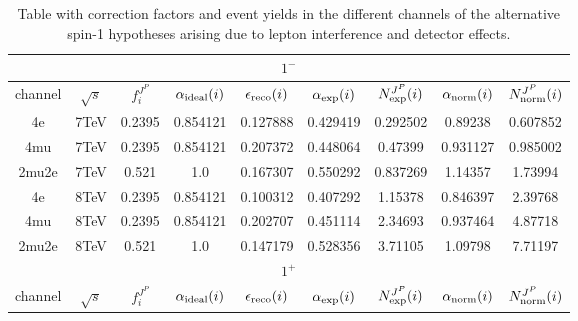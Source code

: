 
\begin{table}[b]
\centering
\caption{
Table with correction factors and event yields in the different
channels of the alternative spin-1 hypotheses arising
due to lepton interference and detector effects.}
\centering %
\begin{tabular}{c c c c c c c c c} %
\hline \hline
 \multicolumn{9}{|c|}{$1^{-}$} \\ \hline 
channel & $\sqrt{s}$ & $f_{i}^{J^P}$ & $\alpha_{\rm ideal} (i)$ & $\epsilon_{\rm reco} (i)$ & $\alpha_{\rm exp} (i)$ & $N^{J^P}_{\rm exp} (i)$ & $\alpha_{\rm norm} (i)$ & $N^{J^P}_{\rm norm} (i)$\\ \hline 
4e & 7TeV & 0.2395 & 0.854121 & 0.127888 & 0.429419
 & 0.292502%
 & 0.89238 & 0.607852 \\ \hline 4mu & 7TeV & 0.2395 & 0.854121 & 0.207372 & 0.448064
 & 0.47399%
 & 0.931127 & 0.985002 \\ \hline 2mu2e & 7TeV & 0.521 & 1.0  & 0.167307 & 0.550292
 & 0.837269%
 & 1.14357 & 1.73994 \\ \hline \hline 
4e & 8TeV & 0.2395 & 0.854121 & 0.100312 & 0.407292
 & 1.15378%
 & 0.846397 & 2.39768 \\ \hline 4mu & 8TeV & 0.2395 & 0.854121 & 0.202707 & 0.451114
 & 2.34693%
 & 0.937464 & 4.87718 \\ \hline 2mu2e & 8TeV & 0.521 & 1.0  & 0.147179 & 0.528356
 & 3.71105%
 & 1.09798 & 7.71197 \\ \hline \hline 
 \multicolumn{9}{|c|}{$1^{+}$} \\ \hline 
channel & $\sqrt{s}$ & $f_{i}^{J^P}$ & $\alpha_{\rm ideal} (i)$ & $\epsilon_{\rm reco} (i)$ & $\alpha_{\rm exp} (i)$ & $N^{J^P}_{\rm exp} (i)$ & $\alpha_{\rm norm} (i)$ & $N^{J^P}_{\rm norm} (i)$\\ \hline 

\end{tabular}
\end{table}
